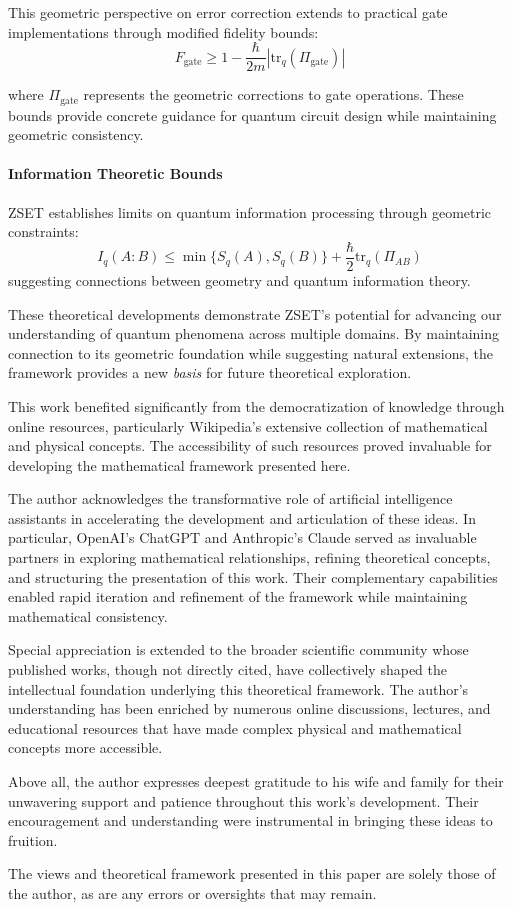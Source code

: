 \documentclass[10pt]{article}
\begin{document}
This geometric perspective on error correction extends to practical gate implementations through modified fidelity bounds:
\[
F_\text{gate} \geq 1 - \frac{\hbar}{2m}|\text{tr}_q(\Pi_\text{gate})|
\]

where $\Pi_\text{gate}$ represents the geometric corrections to gate operations. These bounds provide concrete guidance for quantum circuit design while maintaining geometric consistency.

\paragraph{Information Theoretic Bounds}

ZSET establishes limits on quantum information processing through geometric constraints:
\[
I_q(A:B) \leq \min\{S_q(A), S_q(B)\} + \frac{\hbar}{2}\text{tr}_q(\Pi_{AB})
\]
suggesting connections between geometry and quantum information theory.

These theoretical developments demonstrate ZSET's potential for advancing our understanding of quantum phenomena across multiple domains. By maintaining connection to its geometric foundation while suggesting natural extensions, the framework provides a new \emph{basis} for future theoretical exploration.

\newpage

\begin{acknowledgements}
   This work benefited significantly from the democratization of knowledge through online resources, particularly Wikipedia's extensive collection of mathematical and physical concepts. The accessibility of such resources proved invaluable for developing the mathematical framework presented here.

   The author acknowledges the transformative role of artificial intelligence assistants in accelerating the development and articulation of these ideas. In particular, OpenAI's ChatGPT and Anthropic's Claude served as invaluable partners in exploring mathematical relationships, refining theoretical concepts, and structuring the presentation of this work. Their complementary capabilities enabled rapid iteration and refinement of the framework while maintaining mathematical consistency.

   Special appreciation is extended to the broader scientific community whose published works, though not directly cited, have collectively shaped the intellectual foundation underlying this theoretical framework. The author's understanding has been enriched by numerous online discussions, lectures, and educational resources that have made complex physical and mathematical concepts more accessible.

   Above all, the author expresses deepest gratitude to his wife and family for their unwavering support and patience throughout this work's development. Their encouragement and understanding were instrumental in bringing these ideas to fruition.

   The views and theoretical framework presented in this paper are solely those of the author, as are any errors or oversights that may remain.
\end{acknowledgements}

%
%
\end{document}
